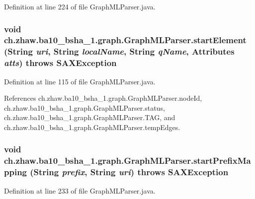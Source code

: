 Definition at line 224 of file GraphMLParser.java.\hypertarget{classch_1_1zhaw_1_1ba10__bsha__1_1_1graph_1_1GraphMLParser_a0e853ca6043b2cb4f676c915209d3abe}{
\subsubsection[{startElement}]{\setlength{\rightskip}{0pt plus 5cm}void ch.zhaw.ba10\_\-bsha\_\-1.graph.GraphMLParser.startElement (String {\em uri}, \/  String {\em localName}, \/  String {\em qName}, \/  Attributes {\em atts})  throws SAXException }}
\label{classch_1_1zhaw_1_1ba10__bsha__1_1_1graph_1_1GraphMLParser_a0e853ca6043b2cb4f676c915209d3abe}


Definition at line 115 of file GraphMLParser.java.

References ch.zhaw.ba10\_\-bsha\_\-1.graph.GraphMLParser.nodeId, ch.zhaw.ba10\_\-bsha\_\-1.graph.GraphMLParser.status, ch.zhaw.ba10\_\-bsha\_\-1.graph.GraphMLParser.TAG, and ch.zhaw.ba10\_\-bsha\_\-1.graph.GraphMLParser.tempEdges.\hypertarget{classch_1_1zhaw_1_1ba10__bsha__1_1_1graph_1_1GraphMLParser_aef06cdfd0c74659d1fdbb66fd20af1d7}{
\subsubsection[{startPrefixMapping}]{\setlength{\rightskip}{0pt plus 5cm}void ch.zhaw.ba10\_\-bsha\_\-1.graph.GraphMLParser.startPrefixMapping (String {\em prefix}, \/  String {\em uri})  throws SAXException }}
\label{classch_1_1zhaw_1_1ba10__bsha__1_1_1graph_1_1GraphMLParser_aef06cdfd0c74659d1fdbb66fd20af1d7}


Definition at line 233 of file GraphMLParser.java.

